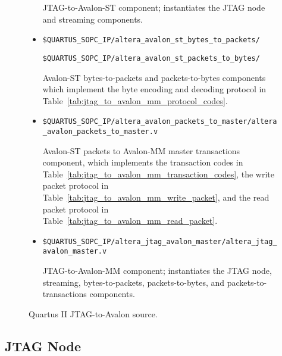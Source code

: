 \documentclass[10pt,twoside]{article}
\begin{document}
\begin{figure}[p]
\begin{minipage}{\textwidth}
\begin{itemize}
JTAG-to-Avalon-ST component; instantiates the JTAG node and streaming components.
%
\item \verb+$QUARTUS_SOPC_IP/altera_avalon_st_bytes_to_packets/+ 

\verb+$QUARTUS_SOPC_IP/altera_avalon_st_packets_to_bytes/+ 

Avalon-ST bytes-to-packets and packets-to-bytes components which
implement the byte encoding and decoding protocol in
Table~\ref{tab:jtag_to_avalon_mm_protocol_codes}.

\item \verb+$QUARTUS_SOPC_IP/altera_avalon_packets_to_master/altera_avalon_packets_to_master.v+ 

Avalon-ST packets to Avalon-MM master transactions component, which
implements the transaction codes in 
Table~\ref{tab:jtag_to_avalon_mm_transaction_codes}, the 
write packet protocol in Table~\ref{tab:jtag_to_avalon_mm_write_packet}, and the
read packet protocol in Table~\ref{tab:jtag_to_avalon_mm_read_packet}.
%
\item \verb+$QUARTUS_SOPC_IP/altera_jtag_avalon_master/altera_jtag_avalon_master.v+ 

JTAG-to-Avalon-MM component; instantiates the JTAG node, streaming, bytes-to-packets,
packets-to-bytes, and packets-to-transactions components.
%
\end{itemize}
\end{minipage}
\caption{Quartus II JTAG-to-Avalon source.}
\label{fig:quartus_jtag_source}
\end{figure}

\clearpage
\subsection{JTAG Node}
\end{document}
